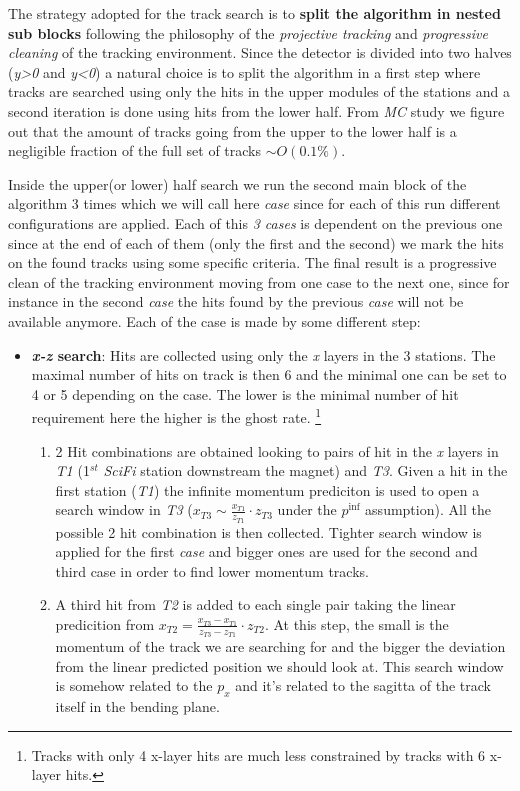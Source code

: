 \documentclass[paper=a4, fontsize=10pt]{scrartcl}
\numberwithin{equation}{section}		%
\numberwithin{figure}{section}			%
\numberwithin{table}{section}				%
\begin{document}
\begin{itemize}
The strategy adopted for the track search is to \textbf{split the algorithm in nested sub blocks} following the philosophy of the \textit{projective tracking} and \textit{progressive cleaning} of the tracking environment. Since the detector is divided into two halves (\textit{y>0} and \textit{y<0}) a natural choice is to split the algorithm in a first step where tracks are searched using only the hits in the upper modules of the stations and a second iteration is done using hits from the lower half. 
From \textit{MC} study we figure out that the amount of tracks going from the upper to the lower half is a negligible fraction of the full set of tracks \textit{$\sim O(0.1 \%)$}. 

Inside the upper(or lower) half search we run the second main block of the algorithm 3 times which we will call here \textit{case} since for each of this run different configurations are applied. Each of this \textit{3 cases} is dependent on the previous one since at the end of each of them (only the first and the second) we mark the hits on the found tracks using some specific criteria. The final result is a progressive clean of the tracking environment moving from one case to the next one, since for instance in the second \textit{case} the hits found by the previous \textit{case} will not be available anymore.
Each of the case is made by some different step:
\begin{itemize}
\item{\textbf{\textit{x-z} search}: Hits are collected using only the \textit{x} layers in the 3 stations. The maximal number of hits on track is then 6 and the minimal one can be set to 4 or 5 depending on the case. The lower is the minimal number of hit requirement here the higher is the ghost rate. \footnote{Tracks with only 4 x-layer hits are much less constrained by tracks with 6 x-layer hits.}
  \begin{enumerate}
  \item{2 Hit combinations are obtained looking to pairs of hit in the \textit{x} layers in \textit{T1} (1$^{st}$ \textit{SciFi} station downstream the magnet) and \textit{T3}. Given a hit in the first station (\textit{T1}) the infinite momentum prediciton is used to open a search window in \textit{T3} ($x_{T3} \sim \frac{x_{T1}}{z_{T1}}\cdot z_{T3}$ under the $p^{\inf}$ assumption). All the possible 2 hit combination is then collected. Tighter search window is applied for the first \textit{case} and bigger ones are used for the second and third case in order to find lower momentum tracks.}
  \item{A third hit  from \textit{T2} is added to each single pair taking the linear predicition from $x_{T2} = \frac{x_{T3}-x_{T1}}{z_{T3}-z_{T1}}\cdot z_{T2}$. At this step, the small is the momentum of the track we are searching for and the bigger the deviation from the linear predicted position we should look at. This search window is somehow related to the $p_{x}$ and it's related to the sagitta of the track itself in the bending plane.}

\end{enumerate}}
\end{itemize}
\end{itemize}
\end{document}
